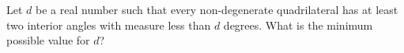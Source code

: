 Let $d$ be a real number such that every non-degenerate quadrilateral has at least two interior angles with measure less than $d$ degrees. What is the minimum possible value for $d$?